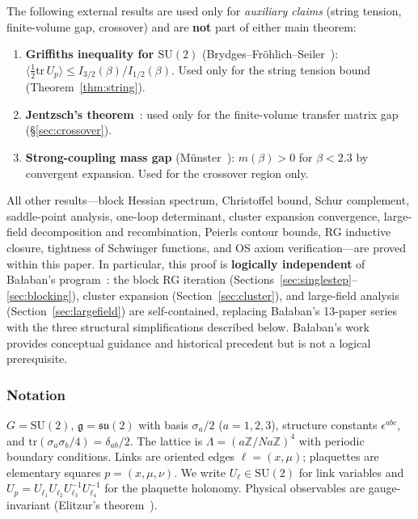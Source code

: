 \documentclass[11pt]{article}
\theoremstyle{definition}
\newcommand{\SU}{\mathrm{SU}}
\newcommand{\su}{\mathfrak{su}}
\newcommand{\tr}{\mathrm{tr}}
\newcommand{\Z}{\mathbb{Z}}
\begin{document}
\noindent The following external results are used only for
\emph{auxiliary claims} (string tension, finite-volume gap,
crossover) and are \textbf{not} part of either main theorem:

\begin{enumerate}[nosep,label=(A\arabic*)]
\item \textbf{Griffiths inequality for $\SU(2)$}
(Brydges--Fr\"ohlich--Seiler~\cite{FroehlichSimon}):
$\langle\frac{1}{2}\tr\,U_p\rangle\le I_{3/2}(\beta)/I_{1/2}(\beta)$.
Used only for the string tension bound
(Theorem~\ref{thm:string}).
\item \textbf{Jentzsch's theorem}~\cite{Seiler82}: used only
for the finite-volume transfer matrix gap
(\S\ref{sec:crossover}).
\item \textbf{Strong-coupling mass gap} (M\"unster~\cite{Munster81}):
$m(\beta)>0$ for $\beta<2.3$ by convergent expansion.
Used for the crossover region only.
\end{enumerate}

\noindent All other results---block Hessian spectrum, Christoffel
bound, Schur complement, saddle-point analysis, one-loop
determinant, cluster expansion convergence, large-field
decomposition and recombination, Peierls contour bounds, RG
inductive closure, tightness of Schwinger functions, and
OS axiom verification---are proved within this
paper.  In particular, this proof is \textbf{logically independent}
of Ba\l aban's program~\cite{BalabanI,BalabanII,BalabanIII,BalabanLF1,BalabanLF2}:
the block RG iteration (Sections~\ref{sec:singlestep}--\ref{sec:blocking}),
cluster expansion (Section~\ref{sec:cluster}), and large-field analysis
(Section~\ref{sec:largefield}) are self-contained, replacing Ba\l aban's
13-paper series with the three structural simplifications described
below.  Ba\l aban's work provides conceptual guidance and historical
precedent but is not a logical prerequisite.

\subsubsection*{Notation} $G=\SU(2)$, $\mathfrak{g}=\su(2)$ with basis
$\sigma_a/2$ ($a=1,2,3$), structure constants $\epsilon^{abc}$,
and $\tr(\sigma_a\sigma_b/4)=\delta_{ab}/2$.  The lattice is
$\Lambda=(a\Z/Na\Z)^4$ with periodic boundary conditions.  Links are
oriented edges $\ell=(x,\mu)$; plaquettes are elementary squares
$p=(x,\mu,\nu)$.  We write $U_\ell\in\SU(2)$ for link variables and
$U_p=U_{\ell_1}U_{\ell_2}U_{\ell_3}^{-1}U_{\ell_4}^{-1}$ for the
plaquette holonomy.  Physical observables are gauge-invariant
(Elitzur's theorem~\cite{Elitzur75}).
\end{document}
